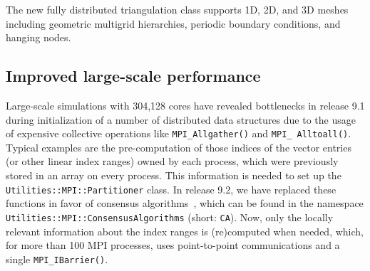 \documentclass{ansarticle-preprint}
\begin{document}
The new fully distributed triangulation class supports 1D, 2D, and 3D meshes
including geometric multigrid hierarchies, periodic boundary conditions, and
hanging nodes.




\subsection{Improved large-scale performance}
\label{subsec:performance}

Large-scale simulations with 304,128 cores have revealed bottlenecks in release 
9.1 during initialization of a number of distributed data structures due to the usage of expensive collective operations 
like \texttt{MPI\_Allgather()} and \texttt{MPI\_\allowbreak
  Alltoall()}. Typical examples are the
pre-computation of those indices of the vector entries (or
other linear index ranges) owned by
each process, which were previously stored in  an array on every process. 
This information is needed to set up 
the  \texttt{Utilities::MPI::Par\-ti\-ti\-oner} class.
In release 9.2, we have replaced these functions in favor of
consensus algorithms~\cite{hoefler2010scalable}, which can be
found in the namespace \texttt{Utilities::\allowbreak MPI::\allowbreak ConsensusAlgorithms} (short: \texttt{CA}).
Now, only the locally relevant information about the index ranges is
(re)computed when needed, which, for more than 100 MPI processes, uses
point-to-point communications and a single \texttt{MPI\_IBarrier()}.

\end{document}
